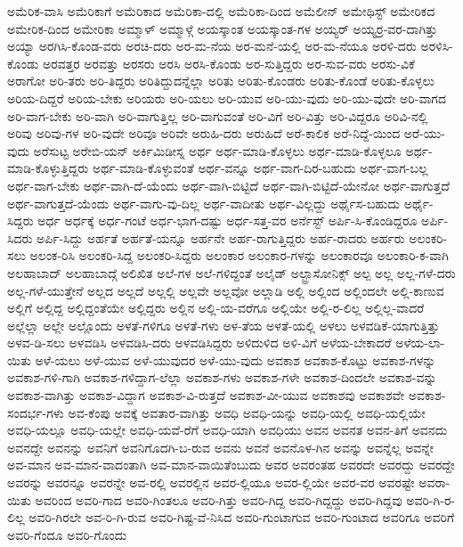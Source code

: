 {ಅಮೆರಿಕ-ವಾಸಿ
ಅಮೆರಿಕಾಗೆ
ಅಮೆರಿಕಾದ
ಅಮೆರಿಕಾ-ದಲ್ಲಿ
ಅಮೆರಿಕಾ-ದಿಂದ
ಅಮೆಲೀನ್
ಅಮೇಥಿಸ್ಟ್
ಅಮೇರಿಕದ
ಅಮೇರಿಕ-ದಿಂದ
ಅಮೇರಿಕಾ
ಅಮ್ಮಾಳ್
ಅಮ್ಮಾಳ್ಗೆ
ಅಯಸ್ಕಾಂತ
ಅಯಸ್ಕಾಂತ-ಗಳ
ಅಯ್ಯರ್
ಅಯ್ಯರ್ರ-ವರ-ದಾಗಿತ್ತು
ಅಯ್ಯಾ
ಅರಗಿಸಿ-ಕೊಂಡ-ವರು
ಅರಚಿ-ದರು
ಅರ-ಮ-ನೆಯ
ಅರ-ಮನೆ-ಯಲ್ಲಿ
ಅರ-ಮ-ನೆಯೂ
ಅರಳಿ-ದರು
ಅರಳಿಸಿ-ಕೊಂಡು
ಅರವತ್ತರ
ಅರವತ್ತು
ಅರಸರು
ಅರಸಿ
ಅರಸಿ-ಕೊಂಡು
ಅರ-ಸುತ್ತಿದ್ದರು
ಅರ-ಸುವ-ವರು
ಅರಸು-ವಿಕೆ
ಅರಾಗೋ
ಅರಿ-ತರು
ಅರಿ-ತಿದ್ದರು
ಅರಿತಿದ್ದುದನ್ನೆಲ್ಲಾ
ಅರಿತು
ಅರಿತು-ಕೊಂಡರು
ಅರಿತು-ಕೊಂಡೆ
ಅರಿತು-ಕೊಳ್ಳಲು
ಅರಿಯ-ದಿದ್ದರೆ
ಅರಿಯ-ಬೇಕು
ಅರಿಯರು
ಅರಿ-ಯಲು
ಅರಿ-ಯುವ
ಅರಿ-ಯು-ವುದು
ಅರಿ-ಯು-ವುದೇ
ಅರಿ-ವಾಗದ
ಅರಿ-ವಾಗ-ಬೇಕು
ಅರಿ-ವಾಗಿ
ಅರಿ-ವಾಗುತ್ತಿಲ್ಲ
ಅರಿ-ವಾಗುವಂತೆ
ಅರಿ-ವಿಗೆ
ಅರಿ-ವಿತ್ತು
ಅರಿ-ವಿದ್ದರೂ
ಅರಿವಿ-ನಲ್ಲಿ
ಅರಿವು
ಅರಿವು-ಗಳ
ಅರಿ-ವುದೇ
ಅರಿವೂ
ಅರಿವೇ
ಅರುಹಿ-ದರು
ಅರುಹಿದೆ
ಅರೆ-ಕಾಲಿಕ
ಅರೆ-ನಿದ್ದೆ-ಯಿಂದ
ಅರೆ-ಯು-ವುದು
ಅರೆಸುಟ್ಟ
ಅರೇಬಿ-ಯನ್
ಅರ್ಕಿಮಿಡೀಸ್ನ
ಅರ್ಥ
ಅರ್ಥ-ಮಾಡಿ-ಕೊಳ್ಳಲು
ಅರ್ಥ-ಮಾಡಿ-ಕೊಳ್ಳಲೂ
ಅರ್ಥ-ಮಾಡಿ-ಕೊಳ್ಳುತ್ತಿದ್ದರು
ಅರ್ಥ-ಮಾಡಿ-ಕೊಳ್ಳುವಂತೆ
ಅರ್ಥ-ವನ್ನೂ
ಅರ್ಥ-ವಾಗ-ದಿರ-ಬಹುದು
ಅರ್ಥ-ವಾಗ-ಬಲ್ಲ
ಅರ್ಥ-ವಾಗ-ಬೇಕು
ಅರ್ಥ-ವಾಗಿ-ದೆ-ಯೆಂದು
ಅರ್ಥ-ವಾಗಿ-ಬಿಟ್ಟಿದೆ
ಅರ್ಥ-ವಾಗಿ-ಬಿಟ್ಟಿದೆ-ಯೇನೋ
ಅರ್ಥ-ವಾಗುತ್ತದೆ
ಅರ್ಥ-ವಾಗುತ್ತದೆ-ಯೆಂದು
ಅರ್ಥ-ವಾಗು-ವು-ದಿಲ್ಲ
ಅರ್ಥ-ವಾದೀತು
ಅರ್ಥ-ವಿಲ್ಲದ್ದು
ಅರ್ಥೈಸ-ಬಹುದು
ಅರ್ಥೈ-ಸಿದ್ದರು
ಅರ್ಧ
ಅರ್ಧಕ್ಕೆ
ಅರ್ಧ-ಗಂಟೆ
ಅರ್ಧ-ಭಾಗ-ದಷ್ಟು
ಅರ್ಧ-ಸತ್ತ-ವರ
ಅರ್ನೆಸ್ಟ್
ಅರ್ಪಿ-ಸಿ-ಕೊಂಡಿದ್ದರೂ
ಅರ್ಪಿ-ಸಿದರು
ಅರ್ಪಿ-ಸಿದ್ದು
ಅರ್ಹತೆ
ಅರ್ಹತೆ-ಯನ್ನೂ
ಅರ್ಹನೇ
ಅರ್ಹ-ರಾಗುತ್ತಿದ್ದರು
ಅರ್ಹ-ರಾದರು
ಅರ್ಹರು
ಅಲಂಕರಿ-ಸಲು
ಅಲಂಕ-ರಿಸಿ
ಅಲಂಕರಿ-ಸಿದ್ದ
ಅಲಂಕರಿ-ಸಿದ್ದರು
ಅಲಂಕಾರ
ಅಲಂಕಾರ-ಗಳನ್ನು
ಅಲಂಕಾರವೂ
ಅಲಂಕಾರಿ-ಕ-ವಾಗಿ
ಅಲಹಾಬಾದ್
ಅಲಹಾಬಾದ್ಗೆ
ಅಲಿಖಿತ
ಅಲೆ-ಗಳ
ಅಲೆ-ಗಳಿದ್ದಂತೆ
ಅಲೈಡ್
ಅಲ್ಟ್ರಾಸೋನಿಕ್ಸ್
ಅಲ್ಪ
ಅಲ್ಲ
ಅಲ್ಲ-ಗಳೆ-ದರು
ಅಲ್ಲ-ಗಳೆ-ಯುತ್ತೇನೆ
ಅಲ್ಲದ
ಅಲ್ಲದೆ
ಅಲ್ಲಲ್ಲಿ
ಅಲ್ಲವೇ
ಅಲ್ಲವೋ
ಅಲ್ಲಾಡಿ
ಅಲ್ಲಿ
ಅಲ್ಲಿಂದ
ಅಲ್ಲಿಂದಲೇ
ಅಲ್ಲಿ-ಕಾಣುವ
ಅಲ್ಲಿಗೆ
ಅಲ್ಲಿದ್ದ
ಅಲ್ಲಿದ್ದಂತೆಯೇ
ಅಲ್ಲಿದ್ದರು
ಅಲ್ಲಿನ
ಅಲ್ಲಿ-ಯ-ವರೆಗೂ
ಅಲ್ಲಿಯೇ
ಅಲ್ಲಿ-ರ-ಲಿಲ್ಲ
ಅಲ್ಲಿಲ್ಲ-ವಾದರೆ
ಅಲ್ಲೆಲ್ಲಾ
ಅಲ್ಲೇ
ಅಲ್ಲೊಂದು
ಅಳತೆ-ಗಳಿಗೂ
ಅಳತೆ-ಗಳು
ಅಳ-ತೆಯ
ಅಳತೆ-ಯಲ್ಲಿ
ಅಳಲು
ಅಳವಡಿಕೆ-ಯಾಗುತ್ತಿತ್ತು
ಅಳವ-ಡಿ-ಸಲು
ಅಳವಡಿಸಿ
ಅಳವಡಿಸಿ-ದರು
ಅಳವಡಿಸಿದ್ದರು
ಅಳಿದುಳಿದ
ಅಳಿ-ವಿಗೆ
ಅಳೆಯ-ಬೇಕಾದರೆ
ಅಳೆಯ-ಲಾ-ಯಿತು
ಅಳೆ-ಯಲು
ಅಳೆ-ಯುವ
ಅಳೆ-ಯುವುದರ
ಅಳೆ-ಯು-ವುದು
ಅವಕಾಶ
ಅವಕಾಶ-ಕೊಟ್ಟು
ಅವಕಾಶ-ಗಳನ್ನು
ಅವಕಾಶ-ಗಳಿ-ಗಾಗಿ
ಅವಕಾಶ-ಗಳಿದ್ದಾಗ-ಲೆಲ್ಲಾ
ಅವಕಾಶ-ಗಳು
ಅವಕಾಶ-ಗಳೇ
ಅವಕಾಶ-ದಿಂದಲೇ
ಅವಕಾಶ-ವನ್ನು
ಅವಕಾಶ-ವಾಗಿತ್ತು
ಅವಕಾಶ-ವಿದ್ದಾಗ
ಅವಕಾಶ-ವಿ-ರುತ್ತದೆ
ಅವಕಾಶ-ವೀ-ಯುವ
ಅವಕಾಶವು
ಅವಕಾಶವೇ
ಅವಕಾಶ-ಸಂದರ್ಭ-ಗಳು
ಅವ-ಕೆಂಪು
ಅವಕ್ಕೆ
ಅವತಾರ-ವಾಗಿತ್ತು
ಅವಧಿ
ಅವಧಿ-ಯನ್ನು
ಅವಧಿ-ಯಲ್ಲಿ
ಅವಧಿ-ಯಲ್ಲಿಯೇ
ಅವಧಿ-ಯಲ್ಲೂ
ಅವಧಿ-ಯಲ್ಲೇ
ಅವಧಿ-ಯವೆ-ರೆಗೆ
ಅವಧಿ-ಯಾಗಿ
ಅವಧಿಯು
ಅವನ
ಅವನತ
ಅವನ-ತಿಗೆ
ಅವನದು
ಅವನದ್ದೇ
ಅವನನ್ನು
ಅವನಿಗೆ
ಅವನಿಗೊದಗಿ-ಬ-ರುವ
ಅವನು
ಅವನೆ
ಅವನೊಳ-ಗಿನ
ಅವನ್ನು
ಅವನ್ನೆಲ್ಲ
ಅವನ್ನೇ
ಅವ-ಮಾನ
ಅವ-ಮಾನ-ವಾದಂತಾಗಿ
ಅವ-ಮಾನ-ವಾಯಿತೆಂಬುದು
ಅವರ
ಅವರಂತಹ
ಅವರದೇ
ಅವರದ್ದು
ಅವರದ್ದೇ
ಅವರನ್ನು
ಅವರನ್ನೂ
ಅವರನ್ನೇ
ಅವ-ರಲ್ಲಿ
ಅವರಲ್ಲಿನ
ಅವರ-ಲ್ಲಿಯೂ
ಅವರ-ಲ್ಲಿಯೇ
ಅವರ-ವರ
ಅವರಷ್ಟೇ
ಅವರಾ-ಯಿತು
ಅವರಿಂದ
ಅವರಿ-ಗಾದ
ಅವರಿ-ಗಿಂತಲೂ
ಅವರಿ-ಗಿತ್ತು
ಅವರಿ-ಗಿದ್ದ
ಅವರಿ-ಗಿದ್ದದ್ದು
ಅವರಿ-ಗಿದ್ದವು
ಅವರಿ-ಗಿ-ರ-ಲಿಲ್ಲ
ಅವರಿ-ಗಿರಲೇ
ಅವ-ರಿ-ಗಿ-ರುವ
ಅವರಿ-ಗಿಷ್ಟ-ವೆ-ನಿಸಿದ
ಅವರಿ-ಗುಂಟಾಗುವ
ಅವರಿ-ಗುಂಟಾದ
ಅವರಿಗೂ
ಅವರಿಗೆ
ಅವರಿ-ಗೆಂದೂ
ಅವರಿ-ಗೊಂದು
}
